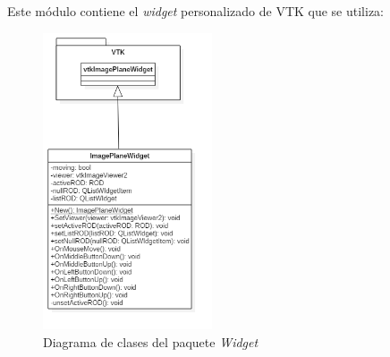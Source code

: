 Este módulo contiene el \textit{widget} personalizado de VTK que se utiliza:

\begin{figure}[H]
	\centering
	\includegraphics[width=5cm]{imagenes/diseno/widget}
	\caption{Diagrama de clases del paquete \textit{Widget}}
	\label{fig:diseno/widget}
\end{figure}